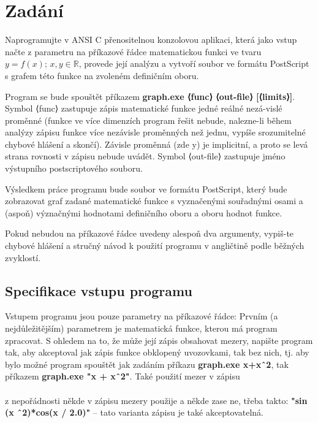 \documentclass[../main.tex]{subfiles}
\begin{document}
\section{Zadání}

Naprogramujte v ANSI C přenositelnou konzolovou aplikaci, která jako\newline
\hfill vstup načte z parametru na příkazové řádce matematickou funkci ve tvaru\newline
$y = f(x); \, x, y \in \mathbb{R}$, provede její analýzu a vytvoří soubor ve formátu PostScript  s grafem této funkce na zvoleném definičním oboru.
\vspace{0.5em}

Program se bude spouštět příkazem \textbf{graph.exe ⟨func⟩ ⟨out-file⟩ [⟨limits⟩]}.
Symbol ⟨func⟩ zastupuje zápis matematické funkce jedné reálné nezá-vislé proměnné (funkce ve více dimenzích program řešit nebude, nalezne-li během analýzy zápisu funkce více nezávisle proměnných než jednu, vypíše srozumitelné chybové hlášení a skončí). Závisle proměnná (zde y) je implicitní, a proto se levá strana rovnosti v zápisu nebude uvádět. Symbol ⟨out-file⟩ zastupuje jméno výstupního postscriptového souboru.

\vspace{0.5em}
Výsledkem práce programu bude soubor ve formátu PostScript, který bude zobrazovat graf zadané matematické funkce s vyznačenými souřadnými osami a (aspoň) význačnými hodnotami definičního oboru a oboru hodnot funkce.

\vspace{0.5em}
Pokud nebudou na příkazové řádce uvedeny alespoň dva argumenty, vypiš-te chybové hlášení a stručný návod k použití programu v angličtině podle běžných zvyklostí.

\subsection{Specifikace vstupu programu}

Vstupem programu jsou pouze parametry na příkazové řádce: Prvním (a nejdůležitějším) parametrem je matematická funkce, kterou má program zpracovat. S ohledem na to, že může její zápis
obsahovat mezery, napište program tak, aby akceptoval jak zápis funkce obklopený uvozovkami,
tak bez nich, tj. aby bylo možné program spouštět jak zadáním příkazu \textbf{graph.exe x+xˆ2}, tak
příkazem \textbf{graph.exe "x + xˆ2"}. Také použití mezer v zápisu \\
 \\ z nepořádnosti někde v zápisu mezery použije a někde zase ne, třeba takto:
\textbf{"sin (x ˆ2)*cos(x / 2.0)"} – tato varianta zápisu je také akceptovatelná.
\end{document}

